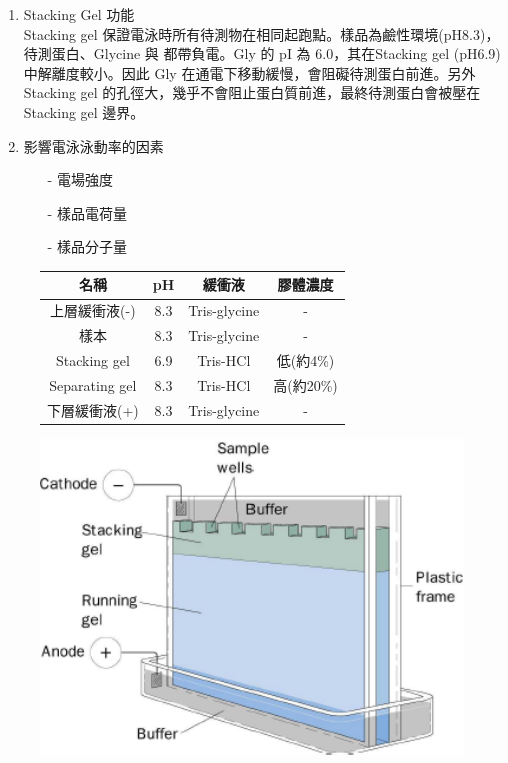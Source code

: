 \begin{enumerate}
  \begin{enumerate}[label=\alph*.]
    \item Stacking Gel 功能\\
    \hspace*{2em}Stacking gel 保證電泳時所有待測物在相同起跑點。樣品為鹼性環境(pH8.3)，待測蛋白、Glycine 與  都帶負電。Gly 的 pI 為 6.0，其在Stacking gel (pH6.9)中解離度較小。因此 Gly 在通電下移動緩慢，會阻礙待測蛋白前進。另外Stacking gel 的孔徑大，幾乎不會阻止蛋白質前進，最終待測蛋白會被壓在Stacking gel 邊界。
    \newpage
    \item 影響電泳泳動率的因素
    \begin{itemize}
      \item[-] 電場強度
      \item[-] 樣品電荷量
      \item[-] 樣品分子量
    \end{itemize}
  \end{enumerate}

  \begin{figure}[H]
    \begin{minipage}[h]{0.6\textwidth} %
      \begin{tabular}{cccc}
        \toprule
        名稱  &pH &緩衝液&膠體濃度\\
        \midrule
        上層緩衝液(-) & 8.3 & Tris-glycine & - \\ 
        樣本 & 8.3 & Tris-glycine & -\\
        Stacking gel& 6.9& Tris-HCl & 低(約4\%)\\
        Separating gel& 8.3& Tris-HCl &高(約20\%)\\
        下層緩衝液(+) & 8.3& Tris-glycine & -\\
        \bottomrule
        \end{tabular}
    \end{minipage}
    \begin{minipage}[h]{0.35\textwidth} %
    \centering
    \includegraphics[width=1\textwidth]{paste_src/2023-11-13-16-00-45.png}
    \end{minipage}
  \end{figure}
\end{enumerate}



